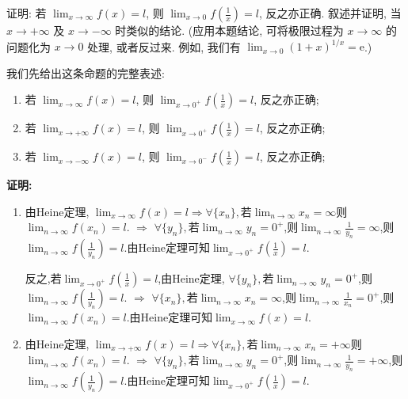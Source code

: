 \begin{exercise}[1.3.8]
    证明: 若 $\lim_{x \to \infty} f(x) = l$, 则 $\lim_{x \to 0} f\left(\frac{1}{x}\right)=l$, 反之亦正确. 叙述并证明, 当 $x \to +\infty$ 及 $x \to -\infty$ 时类似的结论. (应用本题结论, 可将极限过程为 $x \to \infty$ 的问题化为 $x \to 0$ 处理, 或者反过来. 例如, 我们有 $\lim_{x \to 0} (1+x)^{1/x} = \mathrm{e}$.)
\end{exercise}

\begin{solution}
    我们先给出这条命题的完整表述:
    \begin{proposition*}
        \begin{enumerate}[(1)]
            \item 若 $\lim_{x \to \infty} f(x) = l$, 则 $\lim_{x \to 0^+} f\left(\frac{1}{x}\right)=l$, 反之亦正确;
            \item 若 $\lim_{x \to +\infty} f(x) = l$, 则 $\lim_{x \to 0^+} f\left(\frac{1}{x}\right)=l$, 反之亦正确;
            \item 若 $\lim_{x \to -\infty} f(x) = l$, 则 $\lim_{x \to 0^-} f\left(\frac{1}{x}\right)=l$, 反之亦正确;
        \end{enumerate}
    \end{proposition*}
    \noindent
    \textbf{证明:}
    \begin{enumerate}[(1)]
        \item 由Heine定理, $\lim_{x \to \infty} f(x) = l \Rightarrow \forall \{x_n\}, $若$\lim_{n \to \infty} x_n = \infty$则$\lim_{n \to \infty} f(x_n) = l$. $\Rightarrow$ $\forall \{ y_n \}, $若$\lim_{n \to \infty} y_n = 0^+$,则$\lim_{n \to \infty} \frac{1}{y_n} = \infty$,则$\lim_{n \to \infty} f\left( \frac{1}{y_n} \right) = l$.由Heine定理可知$\lim_{x \to 0^+} f\left(\frac{1}{x}\right)=l$.

              反之,若$\lim_{x \to 0^+} f\left(\frac{1}{x}\right)=l$,由Heine定理, $\forall \{y_n\}, $若$\lim_{n \to \infty} y_n = 0^+$,则$\lim_{n \to \infty} f\left( \frac{1}{y_n} \right) = l$. $\Rightarrow$ $\forall \{x_n\}, $若$\lim_{n \to \infty} x_n = \infty$,则$\lim_{n \to \infty} \frac{1}{x_n} = 0^+$,则$\lim_{n \to \infty} f(x_n) = l$.由Heine定理可知$\lim_{x \to \infty} f(x) = l$.
        \item 由Heine定理, $\lim_{x \to +\infty} f(x) = l \Rightarrow \forall \{x_n\}, $若$\lim_{n \to \infty} x_n = +\infty$则$\lim_{n \to \infty} f(x_n) = l$. $\Rightarrow$ $\forall \{ y_n \}, $若$\lim_{n \to \infty} y_n = 0^+$,则$\lim_{n \to \infty} \frac{1}{y_n} = +\infty$,则$\lim_{n \to \infty} f\left( \frac{1}{y_n} \right) = l$.由Heine定理可知$\lim_{x \to 0^+} f\left(\frac{1}{x}\right)=l$.


\end{enumerate}
\end{solution}
